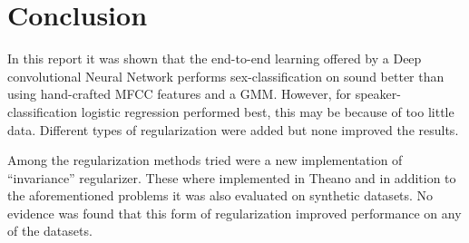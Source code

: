 \section{Conclusion}

In this report it was shown that the end-to-end learning offered by a Deep convolutional Neural Network performs sex-classification on sound better than using hand-crafted MFCC features and a GMM. However, for speaker-classification logistic regression performed best, this may be because of too little data. Different types of regularization were added but none improved the results.

Among the regularization methods tried were a new implementation of ``invariance'' regularizer. These where implemented in Theano and in addition to the aforementioned problems it was also evaluated on synthetic datasets. No evidence was found that this form of regularization improved performance on any of the datasets.